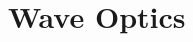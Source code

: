 \documentclass[../book.tex]{subfiles}
\begin{document}
\chapter{Wave Optics}
\label{ch:wave-optics}















\chapterbib
\end{document}
